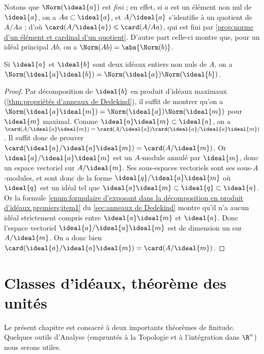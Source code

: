 \documentclass[11pt, useosf,
  title in boldface,
  theorem in new line,
  theorem numbering = section,
  number theorems separately,
]{simplivre}
\begin{document}
    Notons que \( \Norm(\ideal{a}) \) est \emph{fini} ; en effet, si \( a \) est un élément non nul de \( \ideal{a} \), on a \( Aa \subset \ideal{a} \), et \( A/\ideal{a} \) s'identifie à un quotient de \( A/Aa \) ; d'où \( \card(A/\ideal{a}) \leqslant \card(A/Aa) \), qui est fini par \cref{prop:norme d'un élément et cardinal d'un quotient}. D'autre part celle-ci montre que, pour un idéal principal \( Ab \), on a \( \Norm(Ab) = \abs{\Norm(b)} \).

    \begin{proposition}\label{prop:multiplicativité des normes}
        Si \( \ideal{a} \) et \( \ideal{b} \) sont deux idéaux entiers non nuls de \( A \), on a \( \Norm(\ideal{a}\ideal{b}) = \Norm(\ideal{a}) \Norm(\ideal{b}) \).
    \end{proposition}
    \begin{proof}
        Par décomposition de \( \ideal{b} \) en produit d'idéaux maximaux (\cref{thm:propriétés d'anneaux de Dedekind}), il suffit de montrer qu'on a \( \Norm(\ideal{a}\ideal{m}) = \Norm(\ideal{a}) \Norm(\ideal{m}) \) pour \( \ideal{m} \) maximal. Comme \( \ideal{a}\ideal{m} \subset \ideal{a} \), on a \( \card(A/\ideal{a}\ideal{m}) = \card(A/\ideal{a}) \card(\ideal{a}/\ideal{a}\ideal{m}) \). Il suffit donc de prouver \( \card(\ideal{a}/\ideal{a}\ideal{m}) = \card(A/\ideal{m}) \). Or \( \ideal{a}/\ideal{a}\ideal{m} \) est un \( A \)‑module annulé par \( \ideal{m} \), donc un espace vectoriel sur \( A/\ideal{m} \). Ses sous-espaces vectoriels sont ses sous-\( A \)‑modules, et sont donc de la forme \( \ideal{q}/\ideal{a}\ideal{m} \) où \( \ideal{q} \) est un idéal tel que \( \ideal{a}\ideal{m} \subset \ideal{q} \subset \ideal{a} \). Or la formule \ref{enum:formulaire d'exposant dans la décomposition en produit d'idéaux premiers;item1} du \cref{sec:anneaux de Dedekind} montre qu'il n'a aucun idéal strictement compris entre \( \ideal{a}\ideal{m} \) et \( \ideal{a} \). Donc l'espace vectoriel \( \ideal{a}/\ideal{a}\ideal{m} \) est de dimension un sur \( A/\ideal{m} \). On a donc bien \( \card(\ideal{a}/\ideal{a}\ideal{m}) = \card(A/\ideal{m}) \).
    \end{proof}


\chapter{Classes d'idéaux, théorème des unités}\label{chap:classes d'idéaux;théorème des unités}

Le présent chapitre est consacré à deux importants théorèmes de finitude. Quelques outils d'Analyse (empruntés à la Topologie et à l'intégration dans \( \R^n \)) nous serons utiles.
\end{document}
